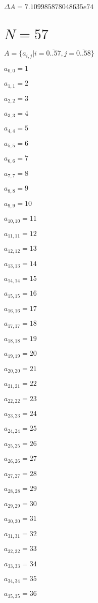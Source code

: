 \documentclass[a4paper,12pt]{article}
\begin{document}
$\Delta A = 7.109985878048635e74$



\section{ $N = 57$ }
$A = \{ a _{ i, j } | i = \overline { 0..57 }, j = \overline { 0..58 } \}$

$a _{ 0, 0 } = 1$

$a _{ 1, 1 } = 2$

$a _{ 2, 2 } = 3$

$a _{ 3, 3 } = 4$

$a _{ 4, 4 } = 5$

$a _{ 5, 5 } = 6$

$a _{ 6, 6 } = 7$

$a _{ 7, 7 } = 8$

$a _{ 8, 8 } = 9$

$a _{ 9, 9 } = 10$

$a _{ 10, 10 } = 11$

$a _{ 11, 11 } = 12$

$a _{ 12, 12 } = 13$

$a _{ 13, 13 } = 14$

$a _{ 14, 14 } = 15$

$a _{ 15, 15 } = 16$

$a _{ 16, 16 } = 17$

$a _{ 17, 17 } = 18$

$a _{ 18, 18 } = 19$

$a _{ 19, 19 } = 20$

$a _{ 20, 20 } = 21$

$a _{ 21, 21 } = 22$

$a _{ 22, 22 } = 23$

$a _{ 23, 23 } = 24$

$a _{ 24, 24 } = 25$

$a _{ 25, 25 } = 26$

$a _{ 26, 26 } = 27$

$a _{ 27, 27 } = 28$

$a _{ 28, 28 } = 29$

$a _{ 29, 29 } = 30$

$a _{ 30, 30 } = 31$

$a _{ 31, 31 } = 32$

$a _{ 32, 32 } = 33$

$a _{ 33, 33 } = 34$

$a _{ 34, 34 } = 35$

$a _{ 35, 35 } = 36$
\end{document}
